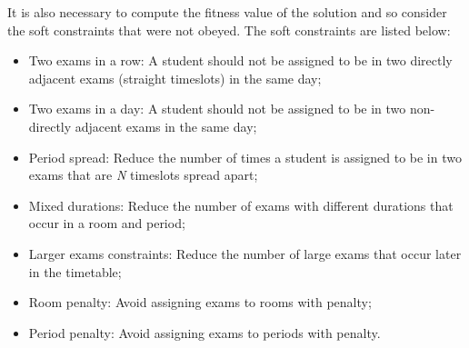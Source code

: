It is also necessary to compute the fitness value of the solution and so consider the soft constraints that were not obeyed. The soft constraints are listed below:
\begin{itemize}
	\item Two exams in a row: A student should not be assigned to be in two directly adjacent exams (straight timeslots) in the same day;
	\item Two exams in a day: A student should not be assigned to be in two non-directly adjacent exams in the same day;
	\item Period spread: Reduce the number of times a student is assigned to be in two exams that are \textit{N} timeslots spread apart;
	\item Mixed durations: Reduce the number of exams with different durations that occur in a room and period;
	\item Larger exams constraints: Reduce the number of large exams that occur later in the timetable;
	\item Room penalty: Avoid assigning exams to rooms with penalty;
	\item Period penalty: Avoid assigning exams to periods with penalty.
\end{itemize}

